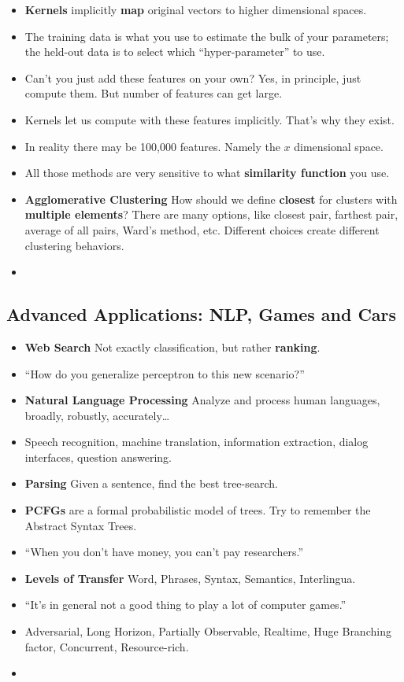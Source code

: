 \documentclass[twocolumn]{article}
\begin{document}
\begin{itemize}
\item \textbf{Kernels} implicitly \textbf{map} original vectors to
  higher dimensional spaces.
\item The training data is what you use to estimate the bulk of your
  parameters; the held-out data is  to select which
  ``hyper-parameter'' to use.
\item Can't you just add these features on your own? Yes, in
  principle, just compute them. But number of features can get large. 
\item Kernels let us compute with these features implicitly. That's
  why they exist.
\item In reality there may be 100,000 features. Namely the $x$
  dimensional space.
\item All those methods are very sensitive to what \textbf{similarity
    function} you use.
\item \textbf{Agglomerative Clustering} How should we define
  \textbf{closest} for clusters with \textbf{multiple elements}? There
  are many options, like closest pair, farthest pair, average of all
  pairs, Ward's method, etc. Different choices create different
  clustering behaviors.
\item 
\end{itemize}

\subsection{Advanced Applications: NLP, Games and Cars}
\label{sec:advanc-appl-nlp}

\begin{itemize}
\item \textbf{Web Search} Not exactly classification, but rather
  \textbf{ranking}. 
\item ``How do you generalize perceptron to this new scenario?''
\item \textbf{Natural Language Processing} Analyze and process human
  languages, broadly, robustly, accurately\ldots
\item Speech recognition, machine translation, information extraction,
  dialog interfaces, question answering.
\item \textbf{Parsing} Given a sentence, find the best tree-search.
\item \textbf{PCFGs} are a formal probabilistic model of trees. Try to
  remember the Abstract Syntax Trees.
\item ``When you don't have money, you can't pay researchers.''
\item \textbf{Levels of Transfer} Word, Phrases, Syntax, Semantics,
  Interlingua. 
\item ``It's in general not a good thing to play a lot of computer
  games.'' 
\item Adversarial, Long Horizon, Partially Observable, Realtime, Huge
  Branching factor, Concurrent, Resource-rich.
\item 
\end{itemize}
\end{document}
